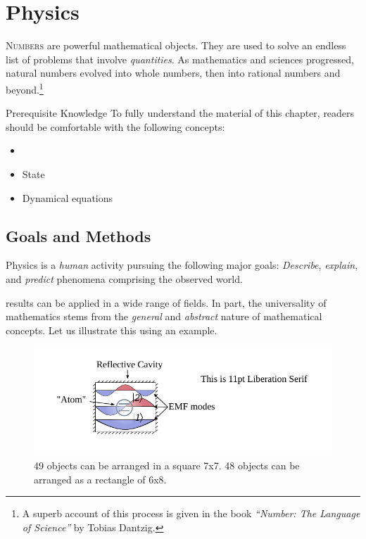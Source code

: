 \graphicspath{{../02Physics/pics/}}
	
\chapter[Physics]{Physics}\label{ch:Physics}

\lettrine[lines=2]{\color{darkocre}N}{umbers} are powerful
mathematical objects. They are used to solve
an endless list of problems that involve \emph{quantities}. As
mathematics
and sciences progressed, natural numbers evolved into whole
numbers, then into rational numbers and beyond.\footnote{A superb account of
this process is given in the book \emph{``Number: The Language of
Science''} by Tobias Dantzig.}

\begin{myprereq}{Prerequisite Knowledge}
	To fully understand the material of this chapter, readers should be comfortable with the following concepts:
	
	\begin{itemize}
		\item \phantom{phantom}
		\vspace{-0.5cm}
		\item State
		\item Dynamical equations
	\end{itemize}	
\end{myprereq}

\section{Goals and Methods}
Physics is a \emph{human} activity pursuing the following major goals: \emph{Describe}, \emph{explain}, and \emph{predict} phenomena comprising the observed world.

results can be applied in a wide range of fields. In part, the universality of mathematics
stems from the \emph{general} and \emph{abstract} nature of mathematical
concepts. Let us illustrate this using an example.

\begin{figure}%
  \includegraphics[scale=1.0]{defaultFigureTemplate}
  \caption{49 objects can be arranged in a square 7x7. 48 objects can
    be arranged as a rectangle of 6x8.}
  \label{fig:numbersExampleGenerality}
\end{figure}

